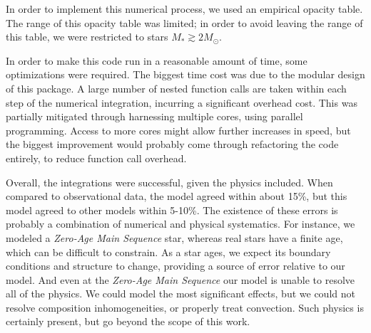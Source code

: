 In order to implement this numerical process, we used an empirical opacity table. The range of this opacity table was limited; in order to avoid leaving the range of this table, we were restricted to stars $M_\ast \gtrsim 2 M_\odot$.

In order to make this code run in a reasonable amount of time, some optimizations were required.  The biggest time cost was due to the modular design of this package. A large number of nested function calls are taken within each step of the numerical integration, incurring a significant overhead cost.  This was partially mitigated through harnessing multiple cores, using parallel programming.  Access to more cores might allow further increases in speed, but the biggest improvement would probably come through refactoring the code entirely, to reduce function call overhead.

Overall, the integrations were successful, given the physics included.  When compared to observational data, the model agreed within about 15\%, but this model agreed to other models within 5-10\%.  The existence of these errors is probably a combination of numerical and physical systematics.  For instance, we modeled a \emph{Zero-Age Main Sequence} star, whereas real stars have a finite age, which can be difficult to constrain.  As a star ages, we expect its boundary conditions and structure to change, providing a source of error relative to our model.  And even at the \emph{Zero-Age Main Sequence} our model is unable to resolve all of the physics.  We could model the most significant effects, but we could not resolve composition inhomogeneities, or properly treat convection.  Such physics is certainly present, but go beyond the scope of this work.





